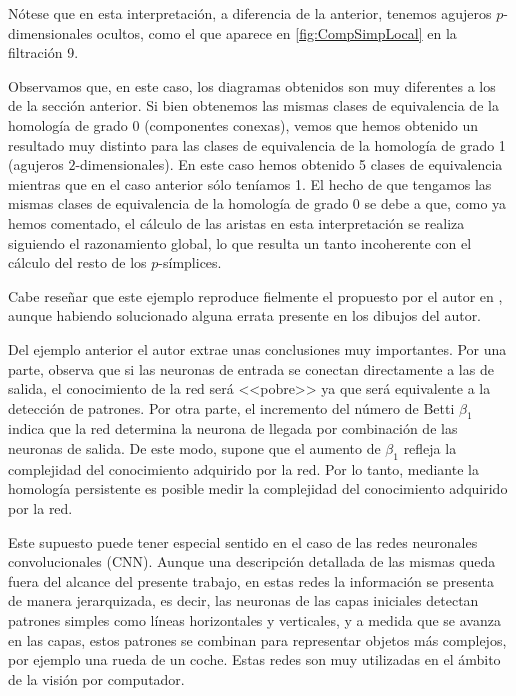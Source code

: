 \documentclass[12pt, a4paper, twoside]{book}
\numberwithin{equation}{section}
\theoremstyle{definition}
\newenvironment{ejem}
  {\pushQED{\qed}\renewcommand{\qedsymbol}{$\blacktriangleleft$}\ejemplo}
  {\popQED\endejemplo}
\theoremstyle{remark}
\theoremstyle{plain}
\begin{document}
\begin{ejem}
	Nótese que en esta interpretación, a diferencia de la anterior, 
	tenemos agujeros $p$-dimensionales ocultos, como el que aparece en 
	\autoref{fig:CompSimpLocal} en la filtración 9.

	Observamos que, en este caso, los diagramas obtenidos son muy 
	diferentes a los de la sección anterior. Si bien obtenemos las mismas 
	clases de equivalencia de la homología de grado 0 (componentes 
	conexas), vemos que hemos obtenido un resultado muy distinto para las
	clases de equivalencia de la homología de grado 1 (agujeros 
	$2$-dimensionales). En este caso hemos obtenido 5 clases de 
	equivalencia mientras que en el caso anterior sólo teníamos 1. El 
	hecho de que tengamos las mismas clases de equivalencia de la 
	homología de grado 0 se debe a que, como ya hemos comentado, el 
	cálculo de las aristas en esta interpretación se realiza siguiendo el
	razonamiento global, lo que resulta un tanto incoherente con el 
	cálculo del resto de los $p$-símplices. 

	Cabe reseñar que este ejemplo reproduce fielmente el propuesto por el 
	autor en \cite{Articulo-Watanabe}, aunque habiendo solucionado alguna 
	errata presente en los dibujos del autor.
	\end{ejem}

	Del ejemplo anterior el autor extrae unas conclusiones muy 
	importantes. Por una parte, observa que si las neuronas de entrada se 
	conectan directamente a las de salida, el conocimiento de la red será 
	<<pobre>> ya que será equivalente a la detección de patrones. Por otra 
	parte, el incremento del número de Betti $\beta_{1}$ indica que la red 
	determina la neurona de llegada por combinación de las neuronas de 
	salida. De este modo, supone que el aumento de $\beta_{1}$ refleja la 
	complejidad del conocimiento adquirido por la red. Por lo tanto, 
	mediante la homología persistente es posible medir la complejidad del 
	conocimiento adquirido por la red.

	Este supuesto puede tener especial sentido en el caso de las redes 
	neuronales convolucionales (CNN). Aunque una descripción detallada de 
	las mismas queda fuera del alcance del presente trabajo, en estas 
	redes la información se presenta de manera jerarquizada, es decir, las
	neuronas de las capas iniciales detectan patrones simples como líneas
	horizontales y verticales, y a medida que se avanza en las capas, 
	estos patrones se combinan para representar objetos más complejos, por 
	ejemplo una rueda de un coche. Estas redes son muy utilizadas en el 
	ámbito de la visión por computador.
\end{document}
